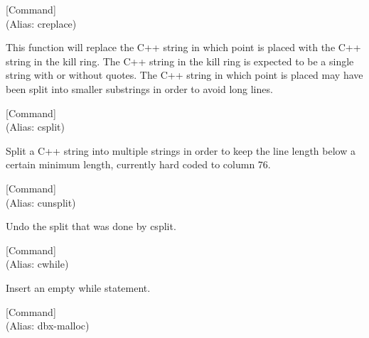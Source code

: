 \vspace{1em}
\noindent
{}
\usebox{\funcname}
 \hfill [Command]\\%
 (Alias: creplace)

\begin{doc-string}
This function will replace the C++ string in which point is placed with the C++ string
in the kill ring.  The C++ string in the kill ring is expected to be a single string with
or without quotes.  The C++ string in which point is placed may have been split into
smaller substrings in order to avoid long lines.
\end{doc-string}

\vspace{1em}
\noindent
{}
\usebox{\funcname}
 \hfill [Command]\\%
 (Alias: csplit)

\begin{doc-string}
Split a C++ string into multiple strings in order to keep the line length below a
certain minimum length, currently hard coded to column 76.
\end{doc-string}

\vspace{1em}
\noindent
{}
\usebox{\funcname}
 \hfill [Command]\\%
 (Alias: cunsplit)

\begin{doc-string}
Undo the split that was done by csplit.
\end{doc-string}

\vspace{1em}
\noindent
{}
\usebox{\funcname}
 \hfill [Command]\\%
 (Alias: cwhile)

\begin{doc-string}
Insert an empty while statement.
\end{doc-string}

\vspace{1em}
\noindent
{}
\usebox{\funcname}
 \hfill [Command]\\%
 (Alias: dbx-malloc)

